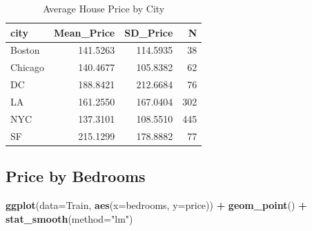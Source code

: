 \documentclass[]{book}
\newenvironment{Shaded}{\begin{snugshade}}{\end{snugshade}}
\newcommand{\KeywordTok}[1]{\textcolor[rgb]{0.13,0.29,0.53}{\textbf{#1}}}
\newcommand{\DataTypeTok}[1]{\textcolor[rgb]{0.13,0.29,0.53}{#1}}
\newcommand{\StringTok}[1]{\textcolor[rgb]{0.31,0.60,0.02}{#1}}
\newcommand{\OperatorTok}[1]{\textcolor[rgb]{0.81,0.36,0.00}{\textbf{#1}}}
\newcommand{\NormalTok}[1]{#1}
\begin{document}
\begin{Shaded}
\end{Shaded}

\begin{table}

\caption{\label{tab:unnamed-chunk-671}Average House Price by City}
\centering
\begin{tabular}[t]{l|r|r|r}
\hline
city & Mean\_Price & SD\_Price & N\\
\hline
Boston & 141.5263 & 114.5935 & 38\\
\hline
Chicago & 140.4677 & 105.8382 & 62\\
\hline
DC & 188.8421 & 212.6684 & 76\\
\hline
LA & 161.2550 & 167.0404 & 302\\
\hline
NYC & 137.3101 & 108.5510 & 445\\
\hline
SF & 215.1299 & 178.8882 & 77\\
\hline
\end{tabular}
\end{table}

\subsection{Price by Bedrooms}\label{price-by-bedrooms}

\begin{Shaded}
\begin{Highlighting}[]
\KeywordTok{ggplot}\NormalTok{(}\DataTypeTok{data=}\NormalTok{Train, }\KeywordTok{aes}\NormalTok{(}\DataTypeTok{x=}\NormalTok{bedrooms, }\DataTypeTok{y=}\NormalTok{price)) }\OperatorTok{+}\StringTok{ }\KeywordTok{geom_point}\NormalTok{() }\OperatorTok{+}\StringTok{ }\KeywordTok{stat_smooth}\NormalTok{(}\DataTypeTok{method=}\StringTok{"lm"}\NormalTok{)}
\end{Highlighting}
\end{Shaded}
\end{document}
